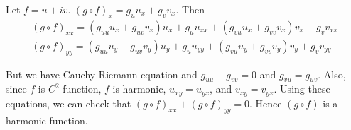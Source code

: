 \begin{problem}[1.5] \hfill

	Let $f = u+iv$. $(g\circ f)_x = g_u u_x + g_v v_x$. Then
	\begin{equation*}
		\begin{split}
			\left( g\circ f \right)_{xx} = \left( g_{uu} u_x + g_{uv} v_x \right) u_x +g_u u_{xx} + \left( g_{vu} u_x + g_{vv} v_x \right) v_x + g_v v_{xx} \\
			\left( g\circ f  \right)_{yy} = \left( g_{uu} u_y + g_{uv }v_y \right)u_y + g_u u_{yy} + \left( g_{vu}u_y + g_{vv}v_y \right)v_y + g_v v_{yy}
		\end{split}
		\label{<+label+>}
	\end{equation*}

	But we have Cauchy-Riemann equation and $g_{uu} + g_{vv} = 0$ and $g_{vu} = g_{uv}$. Also, since $f$ is $C^2$ function, $f$ is harmonic, $u_{xy} = u_{yx}$, and $v_{xy} = v_{yx}$. Using these equations, we can check that $\left( g\circ f \right)_{xx} + \left( g \circ f \right)_{yy} = 0$. Hence $\left( g \circ f \right)$ is a harmonic function.
\end{problem}
